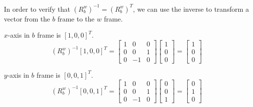 \documentclass[answers]{exam}
\begin{document}
\begin{questions}
\begin{parts}
\begin{solution}
            In order to verify that $(R^w_b)^{-1} = (R^w_b)^T$, we can use the inverse to
            transform a vector from the $b$ frame to the $w$ frame.

            $x$-axis in $b$ frame is $[1, 0, 0]^T$.
            \begin{equation*}
                (R^w_b)^{-1} [1, 0, 0]^T = \begin{bmatrix}
                    1 & 0  & 0 \\
                    0 & 0  & 1 \\
                    0 & -1 & 0
                \end{bmatrix}
                \begin{bmatrix}
                    1 \\
                    0 \\
                    0
                \end{bmatrix}
                = \begin{bmatrix}
                    1 \\
                    0 \\
                    0
                \end{bmatrix}
            \end{equation*}

            $y$-axis in $b$ frame is $[0, 0, 1]^T$.
            \begin{equation*}
                (R^w_b)^{-1} [0, 0, 1]^T = \begin{bmatrix}
                    1 & 0  & 0 \\
                    0 & 0  & 1 \\
                    0 & -1 & 0
                \end{bmatrix}
                \begin{bmatrix}
                    0 \\
                    0 \\
                    1
                \end{bmatrix}
                = \begin{bmatrix}
                    0 \\
                    1 \\
                    0
                \end{bmatrix}
            \end{equation*}


\end{solution}
\end{parts}
\end{questions}
\end{document}
